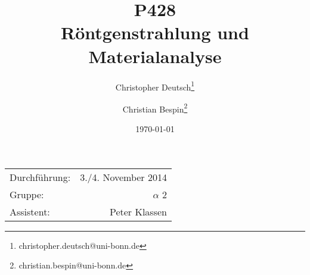 \documentclass[10pt, a4paper]{article}
\title{P428 \\ Röntgenstrahlung und Materialanalyse}
\author{Christopher Deutsch\footnote{christopher.deutsch@uni-bonn.de} \and Christian Bespin\footnote{christian.bespin@uni-bonn.de}}
\date{\today}
\begin{document}
\maketitle

\begin{center}
\begin{tabular}{l r}
Durchführung: & 3./4. November 2014 \\
Gruppe: & $\alpha$ 2 \\
Assistent: & Peter Klassen
\end{tabular}
\end{center}

\begin{abstract}
\noindent
\end{abstract}

\tableofcontents
\newpage

\end{document}
